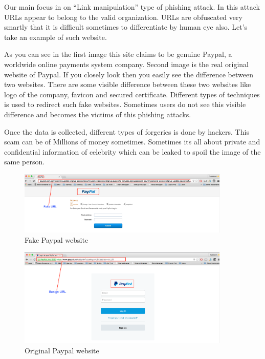 Our main focus in on “Link manipulation” type of phishing attack. In this attack URLs appear to belong to the valid organization. URLs are obfuscated very smartly that it is difficult sometimes to differentiate by human eye also. Let’s take an example of such website. 

As you can see in the first image this site claims to be genuine Paypal, a worldwide online payments system company. Second image is the real original website of Paypal. If you closely look then you easily see the difference between two websites. There are some visible difference between these two websites like logo of the company, favicon and secured certificate. Different types of techniques is used to redirect such fake websites. Sometimes users do not see this visible difference and becomes the victims of this phishing attacks. 

Once the data is collected, different types of forgeries is done by hackers. This scam can be of Millions of money sometimes. Sometimes its all about private and confidential information of celebrity which can be leaked to spoil the image of the same person.  

\begin{figure}[htb]
\centering
\includegraphics[width=0.9\textwidth]{images/Paypal_fake_site.png}
\caption{Fake Paypal website} 
\label{fig:fake_paypal_website}
\end{figure}



\begin{figure}[htb]
\centering
\includegraphics[width=0.9\textwidth]{images/Paypal_original_site.png}
\caption{Original Paypal website} 
\label{fig:original_paypal_website}
\end{figure}



